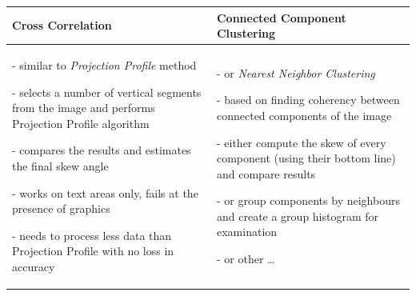 \begin{longtable}{p{19em}p{19em}}
\textbf{Cross Correlation} & \textbf{Connected Component Clustering}\\
\midrule

- similar to \emph{Projection Profile} method

- selects a number of vertical segments from the image and performs Projection Profile algorithm

- compares the results and estimates the final skew angle

- works on text areas only, fails at the presence of graphics

- needs to process less data than Projection Profile with no loss in accuracy
&

- or \emph{Nearest Neighbor Clustering} \citep{skewClustering}

- based on finding coherency between connected components of the image

- either compute the skew of every component (using their bottom line) and compare results

- or group components by neighbours and create a group histogram for examination

- or other \ldots

\end{longtable}



